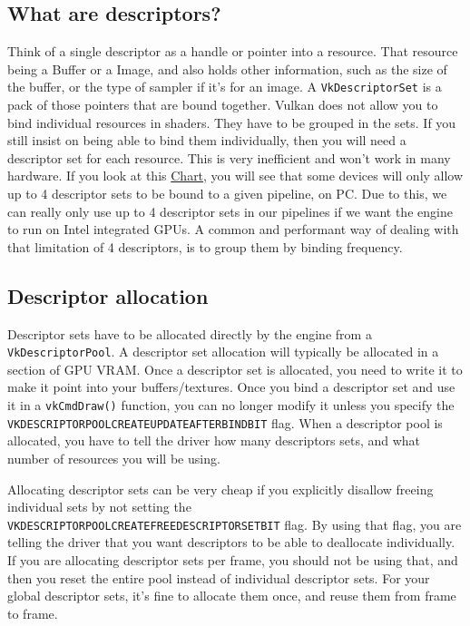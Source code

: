 \documentclass[12pt]{article}
\begin{document}
	\subsection{What are descriptors?}
	Think of a single descriptor as a handle or pointer into a resource. That resource being a Buffer or a Image, and also holds other information, such as the size of the buffer, or the type of sampler if it's for an image. A \texttt{VkDescriptorSet} is a pack of those pointers that are bound together. Vulkan does not allow you to bind individual resources in shaders. They have to be grouped in the sets. If you still insist on being able to bind them individually, then you will need a descriptor set for each resource. This is very inefficient and won't work in many hardware. If you look at this \href{https://vulkan.gpuinfo.org/displaydevicelimit.php?name=maxBoundDescriptorSets&platform=windows}{Chart}, you will see that some devices will only allow up to 4 descriptor sets to be bound to a given pipeline, on PC. Due to this, we can really only use up to 4 descriptor sets in our pipelines if we want the engine to run on Intel integrated GPUs. A common and performant way of dealing with that limitation of 4 descriptors, is to group them by binding frequency.

	\subsection{Descriptor allocation}
	Descriptor sets have to be allocated directly by the engine from a \texttt{VkDescriptorPool}. A descriptor set allocation will typically be allocated in a section of GPU VRAM. Once a descriptor set is allocated, you need to write it to make it point into your buffers/textures. Once you bind a descriptor set and use it in a \texttt{vkCmdDraw()} function, you can no longer modify it unless you specify the \texttt{VK\textunderscore{}DESCRIPTOR\textunderscore{}POOL\textunderscore{}CREATE\textunderscore{}UPDATE\textunderscore{}AFTER\textunderscore{}BIND\textunderscore{}BIT} flag. When a descriptor pool is allocated, you have to tell the driver how many descriptors sets, and what number of resources you will be using.\newline

	Allocating descriptor sets can be very cheap if you explicitly disallow freeing individual sets by not setting the \texttt{VK\textunderscore{}DESCRIPTOR\textunderscore{}POOL\textunderscore{}CREATE\textunderscore{}FREE\textunderscore{}DESCRIPTOR\textunderscore{}SET\textunderscore{}BIT} flag. By using that flag, you are telling the driver that you want descriptors to be able to deallocate individually. If you are allocating descriptor sets per frame, you should not be using that, and then you reset the entire pool instead of individual descriptor sets. For your global descriptor sets, it's fine to allocate them once, and reuse them from frame to frame.
\end{document}
